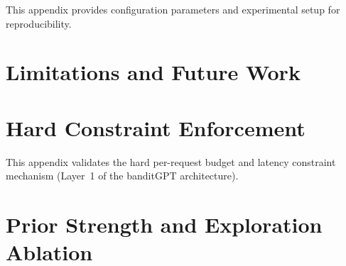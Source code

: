 \documentclass[10pt,letterpaper]{article}
\begin{document}
This appendix provides configuration parameters and experimental setup for reproducibility.






\section{Limitations and Future Work}
\label{appendix:limitations}












\section{Hard Constraint Enforcement}
\label{appendix:constraint_enforcement}

This appendix validates the hard per-request budget and latency constraint
mechanism (Layer~1 of the banditGPT architecture).




\section{Prior Strength and Exploration Ablation}
\label{appendix:alpha_neff_ablation}
\end{document}

